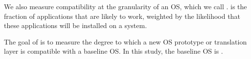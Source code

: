 \begin{comment}
\paragraph{Formal Definition.}
A given system installation ($\mathtt{Inst}$)
is a set of packages installed ($\{\mathtt{pkg}_1, \mathtt{pkg}_2, ..., \mathtt{pkg}_k \in \mathtt{Pkg}_\mathtt{all}\}$).
For each package $\mathtt{pkg}$ in the \osdist{} repository,
our framework generates the API footprint as 
${\mathtt{Footprint}}_\mathtt{pkg} = \{\mathtt{api}_1, \mathtt{api}_2, ..., \mathtt{api}_k \in \mathtt{API}_\mathtt{all}\}$.  
For an API supported by the OS, we calculate the \usagemetric{} as the product 
of probabilities that an installed package will require this API.
This is calculated as follows:
\begin{align*}
&\mathtt{Dependent}_\mathtt{api} = \{\mathtt{pkg}|\mathtt{api} \in \mathtt{Footprint}_\mathtt{pkg}\} \\
&\mathtt{Importance}(\mathtt{api}) = Pr\{\mathtt{Dependent}_\mathtt{api} \bigcap \mathtt{Inst} \neq \emptyset\} \\
&= 1 - Pr\{\forall \mathtt{pkg} \in \mathtt{Dependent}_\mathtt{api}, \mathtt{pkg} \notin \mathtt{Inst}\} \\
&= 1 - \prod_{\mathtt{pkg} \in \mathtt{Dependent}_\mathtt{api}} Pr\{\mathtt{pkg} \notin \mathtt{Inst}\} \\
&= 1 - \prod_{\mathtt{pkg} \in \mathtt{Dependent}_\mathtt{api}} (1 - \frac{\text{installation of $\mathtt{pkg}$}}{\text{total installation}})
\end{align*}
\end{comment}


\papersubsection{\Compatmetric{}}

We also measure compatibility at the granularity of an OS,
which we call \compatmetric{}.
\Compatmetric{} is the fraction of applications that are likely to work,
weighted by the likelihood that these applications will be installed on a system.

The goal of \compatmetric{} is to measure the degree to which a
new OS prototype or translation layer is compatible with a baseline OS.
In this study, the baseline OS is \osdist{}.





